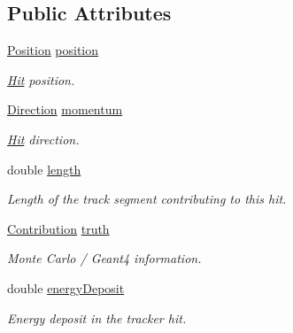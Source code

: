 \subsection*{Public Attributes}
\begin{DoxyCompactItemize}
\item 
\hyperlink{namespace_d_d4hep_1_1_geometry_a55083902099d03506c6db01b80404900}{Position} \hyperlink{class_d_d4hep_1_1_simulation_1_1_geant4_tracker_1_1_hit_a7f992369c5178cac0cc00ffc8a9c36a0}{position}
\begin{DoxyCompactList}\small\item\em \hyperlink{class_d_d4hep_1_1_simulation_1_1_geant4_tracker_1_1_hit}{Hit} position. \end{DoxyCompactList}\item 
\hyperlink{namespace_d_d4hep_1_1_geometry_a56730a0ddb9f3f089c415cd693bd7c19}{Direction} \hyperlink{class_d_d4hep_1_1_simulation_1_1_geant4_tracker_1_1_hit_abdd1f621f202ef83c2078a52cbb242b3}{momentum}
\begin{DoxyCompactList}\small\item\em \hyperlink{class_d_d4hep_1_1_simulation_1_1_geant4_tracker_1_1_hit}{Hit} direction. \end{DoxyCompactList}\item 
double \hyperlink{class_d_d4hep_1_1_simulation_1_1_geant4_tracker_1_1_hit_a39d50debf1a95beaad59be2477877327}{length}
\begin{DoxyCompactList}\small\item\em Length of the track segment contributing to this hit. \end{DoxyCompactList}\item 
\hyperlink{class_d_d4hep_1_1_simulation_1_1_geant4_hit_data_aec2f53237eac2db7d83dd03bca8719c5}{Contribution} \hyperlink{class_d_d4hep_1_1_simulation_1_1_geant4_tracker_1_1_hit_ab786ed42d3c88d911b662e8a083bc54e}{truth}
\begin{DoxyCompactList}\small\item\em Monte Carlo / Geant4 information. \end{DoxyCompactList}\item 
double \hyperlink{class_d_d4hep_1_1_simulation_1_1_geant4_tracker_1_1_hit_a6dddc87da956928e52374040b025f7e4}{energy\+Deposit}
\begin{DoxyCompactList}\small\item\em Energy deposit in the tracker hit. \end{DoxyCompactList}\end{DoxyCompactItemize}

